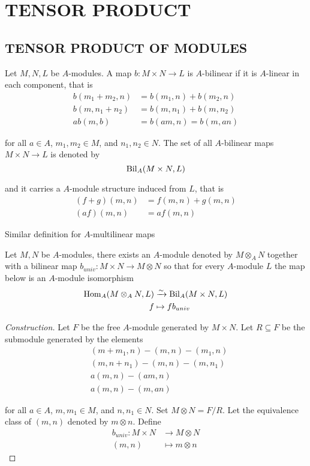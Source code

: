 \chapter{TENSOR PRODUCT}

\section{TENSOR PRODUCT OF MODULES}

\begin{definition}
	Let $M, N, L$ be $A$-modules. A map $b: M \times N \to L$ is $A$-bilinear if it is $A$-linear in each component, that is
	\begin{align*}
		b(m_1 + m_2, n) &= b(m_1, n) + b(m_2, n) \\
		b(m, n_1 + n_2) &= b(m, n_1) + b(m, n_2) \\
		a b(m, b) &= b(am, n) = b(m, an)
	\end{align*}
	
	for all $a \in A$, $m_1, m_2 \in M$, and $n_1, n_2 \in N$. The set of all $A$-bilinear maps $M \times N \to L$ is denoted by
	$$
		\operatorname{Bil}_A(M \times N, L)
	$$
	
	and it carries a $A$-module structure induced from $L$, that is
	\begin{align*}
		(f + g)(m, n) &= f(m, n) + g(m, n) \\
		(a f)(m, n) &= a f(m, n)
	\end{align*}
	
	Similar definition for $A$-multilinear maps
\end{definition}

\begin{theorem}
	Let $M, N$ be $A$-modules, there exists an $A$-module denoted by $M \otimes_A N$ together with a bilinear map $b_{univ}: M \times N \to M \otimes N$ so that for every $A$-module $L$ the map below is an $A$-module isomorphism
	\begin{align*}
		\operatorname{Hom}_A(M \otimes_A N, L) &\xrightarrow{\sim} \operatorname{Bil}_A(M \times N, L) \\
		f &\mapsto f b_{univ}
	\end{align*}
\end{theorem}

\begin{proof}[Construction]
	Let $F$ be the free $A$-module generated by $M \times N$. Let $R \subseteq F$ be the submodule generated by the elements
	\begin{align*}
		&(m + m_1, n) - (m, n) - (m_1, n) \\
		&(m, n + n_1) - (m, n) - (m, n_1) \\
		&a (m, n) - (am, n) \\
		&a(m, n) - (m, an)
	\end{align*}
	
	for all $a \in A$, $m, m_1 \in M$, and $n, n_1 \in N$. Set $M \otimes N = F / R$. Let the equivalence class of $(m, n)$ denoted by $m \otimes n$. Define
	\begin{align*}
		b_{univ}: M \times N &\to M \otimes N \\
		(m, n) &\mapsto m \otimes n
	\end{align*}
\end{proof}


